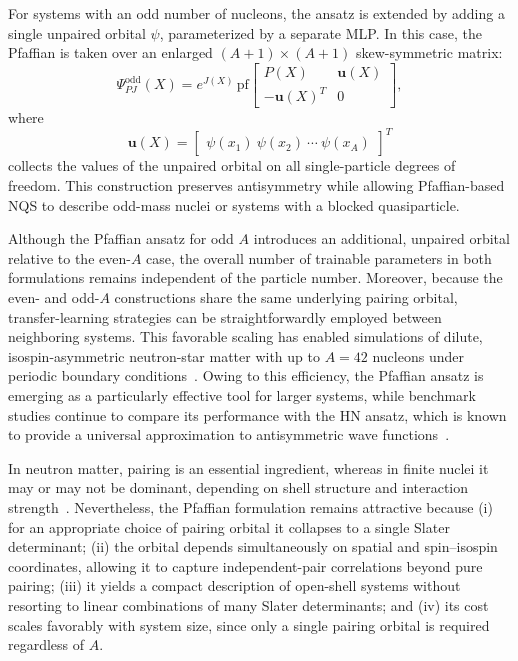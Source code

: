 For systems with an odd number of nucleons, the ansatz is extended by adding a single unpaired orbital $\psi$, parameterized by a separate MLP. In this case, the Pfaffian is taken over an enlarged $(A+1)\times(A+1)$ skew-symmetric matrix:
\begin{equation}
\Psi_{PJ}^{\mathrm{odd}}(X)
= e^{J(X)}
\, \mathrm{pf}
\begin{bmatrix}
P(X) & \mathbf{u}(X) \\
-\mathbf{u}(X)^{T} & 0
\end{bmatrix},
\label{eq:pf_odd}
\end{equation}
where
\begin{equation}
\mathbf{u}(X) =
\begin{bmatrix}
\psi(x_1) \ \psi(x_2) \ \cdots \ \psi(x_A)
\end{bmatrix}^T
\end{equation}
collects the values of the unpaired orbital on all single-particle degrees of freedom. This construction preserves antisymmetry while allowing Pfaffian-based NQS to describe odd-mass nuclei or systems with a blocked quasiparticle.

Although the Pfaffian ansatz for odd $A$ introduces an additional, unpaired orbital relative to the even-$A$ case, the overall number of trainable parameters in both formulations remains independent of the particle number. Moreover, because the even- and odd-$A$ constructions share the same underlying pairing orbital, transfer-learning strategies can be straightforwardly employed between neighboring systems. This favorable scaling has enabled simulations of dilute, isospin-asymmetric neutron-star matter with up to $A=42$ nucleons under periodic boundary conditions~\cite{fore_investigating_2024}. Owing to this efficiency, the Pfaffian ansatz is emerging as a particularly effective tool for larger systems, while benchmark studies continue to compare its performance with the HN ansatz, which is known to provide a universal approximation to antisymmetric wave functions~\cite{moreno_fermionic_2022}.

In neutron matter, pairing is an essential ingredient, whereas in finite nuclei it may or may not be dominant, depending on shell structure and interaction strength~\cite{dean_pairing_2003}. Nevertheless, the Pfaffian formulation remains attractive because (i) for an appropriate choice of pairing orbital it collapses to a single Slater determinant; (ii) the orbital depends simultaneously on spatial and spin–isospin coordinates, allowing it to capture independent-pair correlations beyond pure pairing; (iii) it yields a compact description of open-shell systems without resorting to linear combinations of many Slater determinants; and (iv) its cost scales favorably with system size, since only a single pairing orbital is required regardless of $A$.


